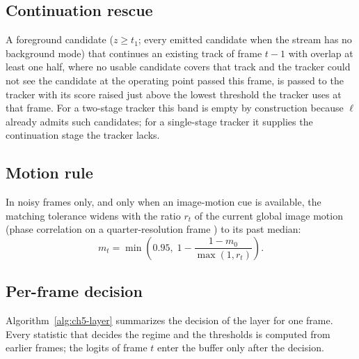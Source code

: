 \subsection{Continuation rescue}
A foreground candidate ($z\ge t_1$; every emitted candidate when the stream has no background mode) that continues an existing track of frame $t-1$ with overlap at least one half, where no usable candidate covers that track and the tracker could not see the candidate at the operating point passed this frame, is passed to the tracker with its score raised just above the lowest threshold the tracker uses at that frame. For a two-stage tracker this band is empty by construction because $\ell$ already admits such candidates; for a single-stage tracker it supplies the continuation stage the tracker lacks.

\subsection{Motion rule}
In noisy frames only, and only when an image-motion cue is available, the matching tolerance widens with the ratio $r_t$ of the current global image motion (phase correlation on a quarter-resolution frame \cite{reddy1996phasecorr}) to its past median:
\begin{equation}
m_t=\min\left(0.95,\; 1-\frac{1-m_0}{\max(1,r_t)}\right).
\label{eq:ch5-motion}
\end{equation}


\subsection{Per-frame decision}
Algorithm~\ref{alg:ch5-layer} summarizes the decision of the layer for one frame. Every statistic that decides the regime and the thresholds is computed from earlier frames; the logits of frame $t$ enter the buffer only after the decision.

